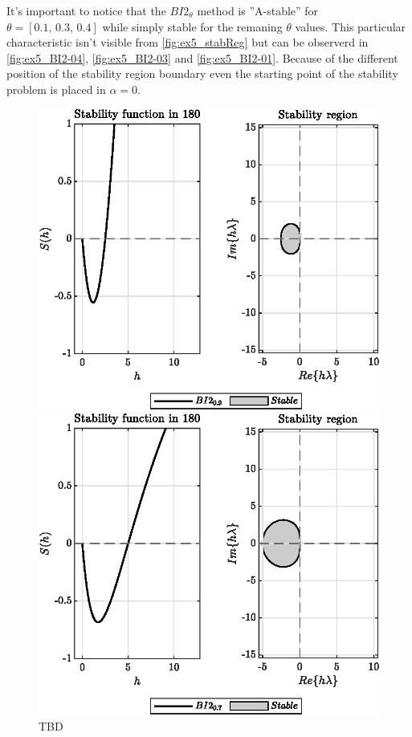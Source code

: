 \documentclass[11pt,a4paper,oneside]{article}
\begin{document}
It's important to notice that the $BI2_{\theta}$ method is ''A-stable'' for $\theta = [0.1,\, 0.3,\, 0.4]$ while simply stable for the remaning $\theta$ values.
This particular characteristic isn't visible from \cref{fig:ex5_stabReg} but can be observerd in \cref{fig:ex5_BI2-04}, \cref{fig:ex5_BI2-03} and \cref{fig:ex5_BI2-01}.
Because of the different position of the stability region boundary even the starting point of the stability problem is placed in $\alpha = 0$.

\begin{figure}[htb]
    \centering
    \begin{minipage}{0.45\textwidth}
        \centering
        \includegraphics*[width=\textwidth, keepaspectratio]{ex5_BI2_0.9.eps}
        \caption[]{\label{fig:ex5_BI2-09} TBD}
    \end{minipage}
    \hspace{0.05\textwidth}
    \begin{minipage}{0.45\textwidth}
        \centering
        \includegraphics*[width=\textwidth, keepaspectratio]{ex5_BI2_0.7.eps}

\end{minipage}
\end{figure}
\end{document}
